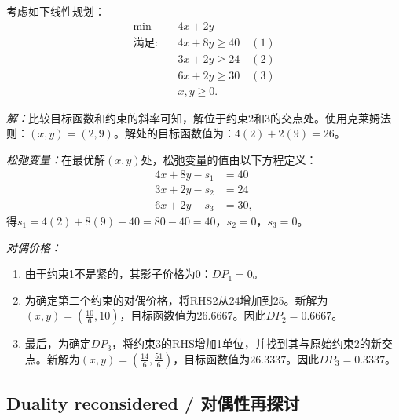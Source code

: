 \begin{translation}
考虑如下线性规划：
\[
\begin{aligned}
\min \quad & 4x + 2y \\
\text{满足:} \quad & 4x + 8y \ge 40 \quad (1) \\
& 3x + 2y \ge 24 \quad (2) \\
& 6x + 2y \ge 30 \quad (3) \\
& x, y \ge 0.
\end{aligned}
\]

\noindent\textit{解：}比较目标函数和约束的斜率可知，解位于约束2和3的交点处。使用克莱姆法则：$(x, y) = (2,9)$。解处的目标函数值为：$4(2) + 2(9) = 26$。

\noindent\textit{松弛变量：}在最优解$(x, y)$处，松弛变量的值由以下方程定义：
\[
\begin{aligned}
4x + 8y - s_1 &= 40 \\
3x + 2y - s_2 &= 24 \\
6x + 2y - s_3 &= 30,
\end{aligned}
\]
得$s_1 = 4(2) + 8(9) - 40 = 80 - 40 = 40$，$s_2 = 0$，$s_3 = 0$。

\noindent\textit{对偶价格：}
\begin{enumerate}
\item 由于约束1不是紧的，其影子价格为0：$DP_1 = 0$。
\item 为确定第二个约束的对偶价格，将RHS2从24增加到25。新解为$(x, y) = \left(\frac{10}{6}, 10\right)$，目标函数值为$26.6667$。因此$DP_2 = 0.6667$。
\item 最后，为确定$DP_3$，将约束3的RHS增加1单位，并找到其与原始约束2的新交点。新解为$(x, y) = \left(\frac{14}{6}, \frac{51}{6}\right)$，目标函数值为$26.3337$。因此$DP_3 = 0.3337$。
\end{enumerate}
\end{translation}

\subsection{Duality reconsidered / 对偶性再探讨}

